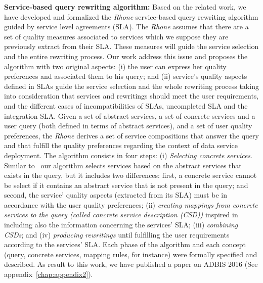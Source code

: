 	
\bigskip
\noindent \textbf{Service-based query rewriting algorithm:}
Based on the related work, we have developed and formalized the \textit{Rhone} service-based query rewriting algorithm guided by service level agreements (SLA). The \textit{Rhone} assumes that there are a set of quality measures associated to services which we suppose they are previously extract from their SLA. These measures will guide the service selection and the entire rewriting process.  Our work address this issue and proposes the algorithm with two original aspects: (i) the user can express her quality preferences and associated them to his query; and (ii) service's quality aspects defined in SLAs guide the service selection and the whole rewriting process taking into consideration that services and rewritings should meet the user requirements, and the different cases of incompatibilities of SLAs, uncompleted SLA and the integration SLA. 
Given a set of abstract services, a set of concrete services and a user query (both defined in terms of abstract services), and a set of user quality preferences, the \textit{Rhone} derives a set of service compositions that answer the query and that fulfill the quality preferences regarding the context of data service deployment. The algorithm consists in four steps: (i) \textit{Selecting concrete services}. Similar to~\cite{Levy:1996,Pottinger:2001} our algorithm selects services based on the abstract services that exists in the query, but it includes two differences: first, a concrete service cannot be select if it contains an abstract service that is not present in the query; and second, the service' quality aspects (extracted from its SLA) must be in accordance with the user quality preferences; (ii) \textit{creating mappings from concrete services to the query (called concrete service description (CSD))} inspired in~\cite{Pottinger:2001} including also the information concerning the services' SLA; (iii) \textit{combining CSDs}; and (iv) \textit{producing rewritings} until fulfilling the user requirements according to the services' SLA. Each phase of the algorithm and each concept (query, concrete services, mapping rules, for instance) were formally specified and described. As result to this work, we have published a paper on ADBIS 2016 (See appendix~\ref{chap:appendix2}).


